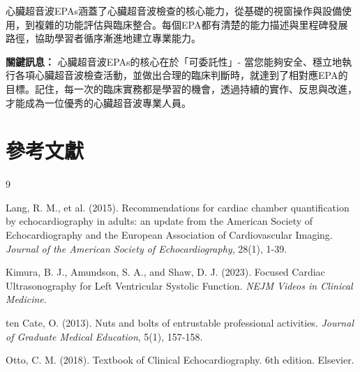 \documentclass[12pt,a4paper]{article}
\begin{document}
心臟超音波EPAs涵蓋了心臟超音波檢查的核心能力，從基礎的視窗操作與設備使用，到複雜的功能評估與臨床整合。每個EPA都有清楚的能力描述與里程碑發展路徑，協助學習者循序漸進地建立專業能力。

\begin{importantbox}
\textbf{關鍵訊息：} 心臟超音波EPAs的核心在於「可委託性」- 當您能夠安全、穩立地執行各項心臟超音波檢查活動，並做出合理的臨床判斷時，就達到了相對應EPA的目標。記住，每一次的臨床實務都是學習的機會，透過持續的實作、反思與改進，才能成為一位優秀的心臟超音波專業人員。
\end{importantbox}

\section{參考文獻}
\begin{thebibliography}{9}

Lang, R. M., et al. (2015). Recommendations for cardiac chamber quantification by echocardiography in adults: an update from the American Society of Echocardiography and the European Association of Cardiovascular Imaging. \textit{Journal of the American Society of Echocardiography}, 28(1), 1-39.

Kimura, B. J., Amundson, S. A., and Shaw, D. J. (2023). Focused Cardiac Ultrasonography for Left Ventricular Systolic Function. \textit{NEJM Videos in Clinical Medicine}.

ten Cate, O. (2013). Nuts and bolts of entrustable professional activities. \textit{Journal of Graduate Medical Education}, 5(1), 157-158.

Otto, C. M. (2018). Textbook of Clinical Echocardiography. 6th edition. Elsevier.

\end{thebibliography}
\end{document}
